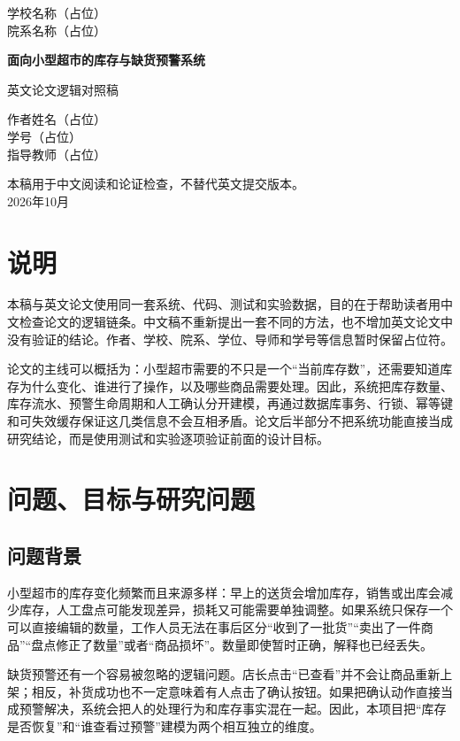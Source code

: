 \documentclass[UTF8,a4paper,11pt]{ctexart}
\begin{document}
\begin{titlepage}
\centering
{学校名称（占位）\\院系名称（占位）\par}
\vfill
{\bfseries 面向小型超市的库存与缺货预警系统\par}
\vspace{1em}
{英文论文逻辑对照稿\par}
\vspace{3em}
{作者姓名（占位）\\学号（占位）\\指导教师（占位）\par}
\vfill
{本稿用于中文阅读和论证检查，不替代英文提交版本。\\2026年10月\par}
\end{titlepage}
\section*{说明}
本稿与英文论文使用同一套系统、代码、测试和实验数据，目的在于帮助读者用中文检查论文的逻辑链条。中文稿不重新提出一套不同的方法，也不增加英文论文中没有验证的结论。作者、学校、院系、学位、导师和学号等信息暂时保留占位符。

论文的主线可以概括为：小型超市需要的不只是一个“当前库存数”，还需要知道库存为什么变化、谁进行了操作，以及哪些商品需要处理。因此，系统把库存数量、库存流水、预警生命周期和人工确认分开建模，再通过数据库事务、行锁、幂等键和可失效缓存保证这几类信息不会互相矛盾。论文后半部分不把系统功能直接当成研究结论，而是使用测试和实验逐项验证前面的设计目标。

\setcounter{tocdepth}{1}
\tableofcontents
\clearpage
{}
\section{问题、目标与研究问题}
\subsection{问题背景}
小型超市的库存变化频繁而且来源多样：早上的送货会增加库存，销售或出库会减少库存，人工盘点可能发现差异，损耗又可能需要单独调整。如果系统只保存一个可以直接编辑的数量，工作人员无法在事后区分“收到了一批货”“卖出了一件商品”“盘点修正了数量”或者“商品损坏”。数量即使暂时正确，解释也已经丢失。

缺货预警还有一个容易被忽略的逻辑问题。店长点击“已查看”并不会让商品重新上架；相反，补货成功也不一定意味着有人点击了确认按钮。如果把确认动作直接当成预警解决，系统会把人的处理行为和库存事实混在一起。因此，本项目把“库存是否恢复”和“谁查看过预警”建模为两个相互独立的维度。
\end{document}
